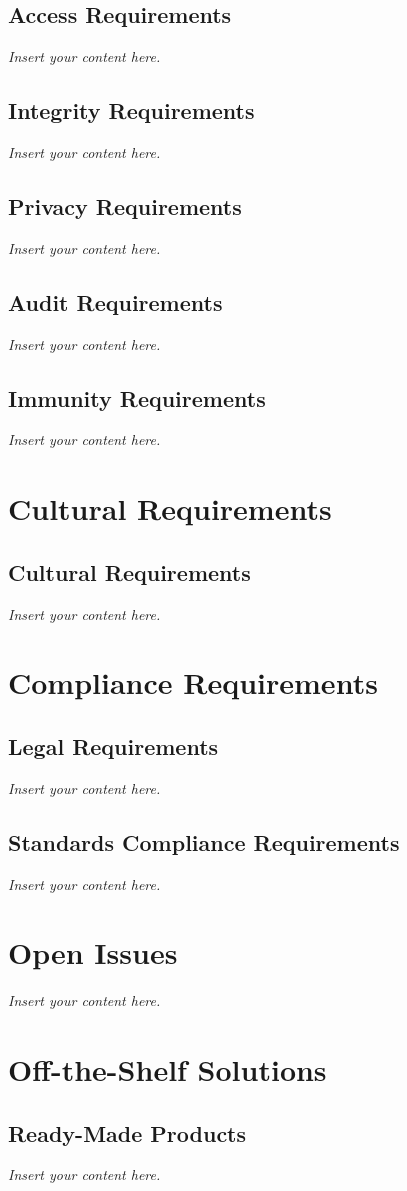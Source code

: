 \documentclass[12pt]{article}
\newcommand{\lips}{\textit{Insert your content here.}}
\begin{document}
\subsection{Access Requirements}
\lips
\subsection{Integrity Requirements}
\lips
\subsection{Privacy Requirements}
\lips
\subsection{Audit Requirements}
\lips
\subsection{Immunity Requirements}
\lips

\section{Cultural Requirements}
\subsection{Cultural Requirements}
\lips

\section{Compliance Requirements}
\subsection{Legal Requirements}
\lips
\subsection{Standards Compliance Requirements}
\lips

\section{Open Issues}
\lips
\section{Off-the-Shelf Solutions}
\subsection{Ready-Made Products}
\lips
\end{document}
